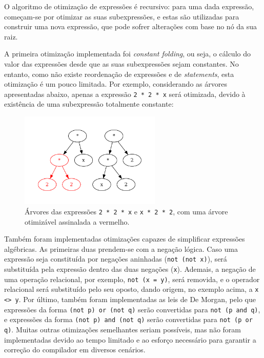 \documentclass[12pt, a4paper]{article}
\begin{document}
O algoritmo de otimização de expressões é recursivo: para uma dada expressão, começam-se por
otimizar as suas subexpressões, e estas são utilizadas para construir uma nova expressão, que pode
sofrer alterações com base no nó da sua raiz.

A primeira otimização implementada foi \emph{constant folding}, ou seja, o cálculo do valor das
expressões desde que as suas subexpressões sejam constantes. No entanto, como não existe reordenação
de expressões e de \emph{statements}, esta otimização é um pouco limitada. Por exemplo, considerando
as árvores apresentadas abaixo, apenas a expressão \texttt{2 * 2 * x} será otimizada, devido à
existência de uma subexpressão totalmente constante:

\begin{figure}[H]
    \centering
    \includegraphics[width=0.6\textwidth]{res/expression-trees.pdf}
    \caption{
        Árvores das expressões \texttt{2 * 2 * x} e \texttt{x * 2 * 2}, com uma árvore otimizável
        assinalada a vermelho.
    }
\end{figure}

Também foram implementadas otimizações capazes de simplificar expressões algébricas. As primeiras
duas prendem-se com a negação lógica. Caso uma expressão seja constituída por negações aninhadas
(\texttt{not (not x)}), será substituída pela expressão dentro das duas negações (\texttt{x}).
Ademais, a negação de uma operação relacional, por exemplo, \texttt{not (x = y)}, será removida, e o
operador relacional será substituído pelo seu oposto, dando origem, no exemplo acima, a
\texttt{x <> y}. Por último, também foram implementadas as leis de De Morgan, pelo que expressões
da forma \texttt{(not p) or (not q)} serão convertidas para \texttt{not (p and q)}, e expressões da
forma \texttt{(not p) and (not q)} serão convertidas para \texttt{not (p or q)}. Muitas outras
otimizações semelhantes seriam possíveis, mas não foram implementadas devido ao tempo limitado e ao
esforço necessário para garantir a correção do compilador em diversos cenários.
\end{document}
